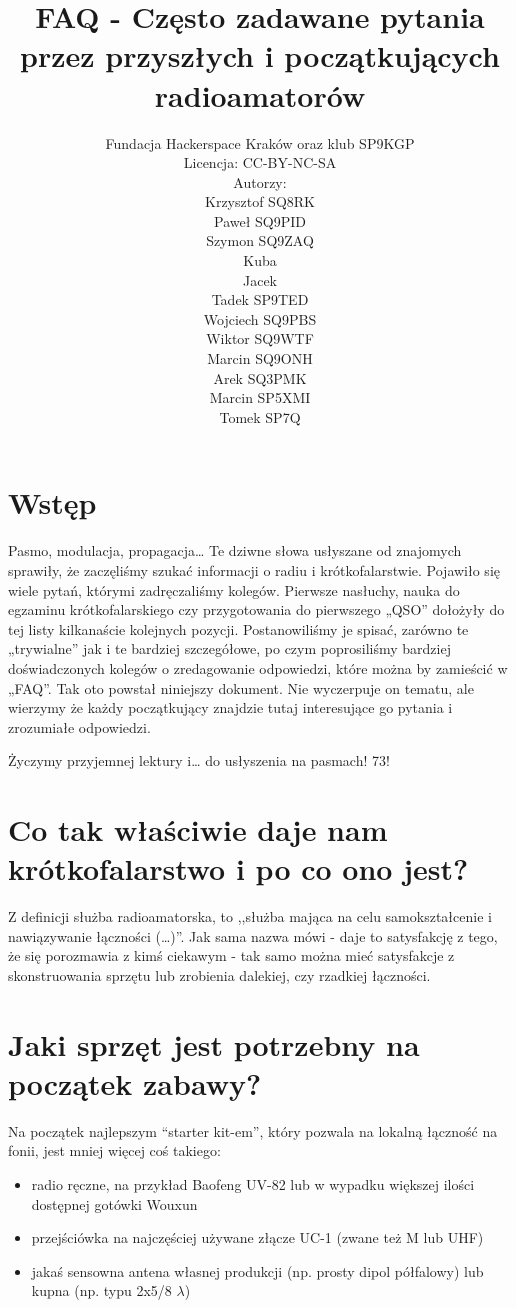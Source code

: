 \documentclass[a4paper,12pt]{article}
\title{\textbf{FAQ - Często zadawane pytania przez przyszłych i początkujących radioamatorów}}
\author{Fundacja Hackerspace Kraków
oraz klub SP9KGP\\
Licencja: CC-BY-NC-SA\\
\vspace{1ex}
Autorzy:\\
Krzysztof SQ8RK\\
Paweł SQ9PID\\
Szymon SQ9ZAQ\\
Kuba\\
Jacek\\
Tadek SP9TED\\
Wojciech SQ9PBS\\
Wiktor SQ9WTF\\
Marcin SQ9ONH\\
Arek SQ3PMK\\
Marcin SP5XMI\\
Tomek SP7Q}
\begin{document}
\maketitle

\newpage
\newpage

\section{Wstęp}
Pasmo, modulacja, propagacja… Te dziwne słowa usłyszane od znajomych sprawiły, że zaczęliśmy szukać informacji o radiu i krótkofalarstwie. Pojawiło się wiele pytań, którymi zadręczaliśmy kolegów. Pierwsze nasłuchy, nauka do egzaminu krótkofalarskiego czy przygotowania do pierwszego „QSO” dołożyły do tej listy kilkanaście kolejnych pozycji. Postanowiliśmy je spisać, zarówno te „trywialne” jak i te bardziej szczegółowe, po czym poprosiliśmy bardziej doświadczonych kolegów o zredagowanie odpowiedzi, które można by zamieścić w „FAQ”. Tak oto powstał niniejszy dokument. Nie wyczerpuje on tematu, ale wierzymy że każdy początkujący znajdzie tutaj interesujące go pytania i zrozumiałe odpowiedzi. 

Życzymy przyjemnej lektury i… do usłyszenia na pasmach! 73!

\section{Co tak właściwie daje nam krótkofalarstwo i po co ono jest?}
Z definicji służba radioamatorska, to ,,służba mająca na celu samokształcenie i nawiązywanie łączności (…)''. Jak sama nazwa mówi - daje to satysfakcję z tego, że się porozmawia z kimś ciekawym - tak samo można mieć satysfakcje z skonstruowania sprzętu lub zrobienia dalekiej, czy rzadkiej łączności.

\section{Jaki sprzęt jest potrzebny na początek zabawy?}
Na początek najlepszym “starter kit-em”, który pozwala na lokalną łączność na fonii, jest mniej więcej coś takiego:
\begin{itemize}
 \item radio ręczne, na przykład Baofeng UV-82 lub w wypadku większej ilości dostępnej gotówki Wouxun
 \item przejściówka na najczęściej używane złącze UC-1 (zwane też M lub UHF)
 \item jakaś sensowna antena własnej produkcji (np. prosty dipol półfalowy) lub kupna (np. typu 2x5/8 \(\lambda\))
\end{itemize}
\end{document}
